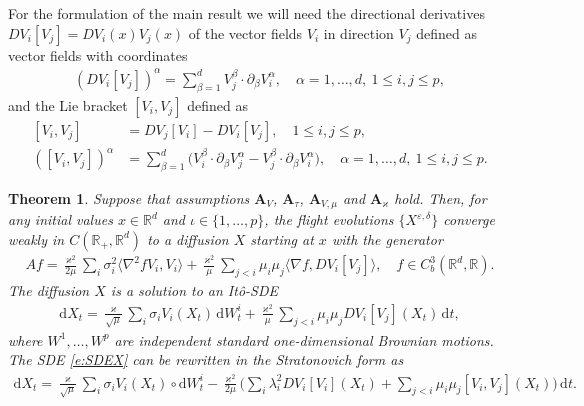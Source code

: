 \documentclass[10pt,a4paper]{amsart}
\newtheorem{thm}{Theorem}
\newcommand{\bR}{\mathbb{R}}
\newcommand{\ba}{\begin{equation}\begin{aligned}}
\newcommand{\di}{\mathrm{d}}
\newcommand{\e}{\varepsilon}
\newcommand{\ea}{\end{aligned}\end{equation}}
\begin{document}
For the formulation of the main result we will need the directional derivatives $D V_i[V_j]=DV_i(x)V_j(x)$ of the vector fields $V_i$
in direction $V_j$ defined as
vector fields with coordinates
\ba
\label{e:DVV}
(D V_i[V_j])^\alpha = \sum_{\beta=1}^d V_j^\beta   \cdot  \partial_\beta V_i^\alpha,\quad \alpha=1,\dots, d,\  1\leq i,j\leq p,
\ea
and the Lie bracket $[V_i,V_j]$ defined as
\ba
{} [V_i,V_j]&= D V_j [ V_i] - D V_i [ V_j],\quad 1\leq i,j\leq p,\\
([V_i,V_j])^\alpha &
= \sum_{\beta=1}^d  \Big(V_i^\beta  \cdot  \partial_\beta V_j^\alpha
- V_j^\beta \cdot \partial_\beta V_i^\alpha\Big) ,\quad \alpha=1,\dots, d,\  1\leq i,j\leq p.
\ea

\begin{thm}
\label{t:A}
Suppose that assumptions
$\mathbf{A}_V$,
$\mathbf{A}_\tau$,
$\mathbf{A}_{V,\mu}$ and
$\mathbf{A}_\varkappa$ hold. Then, for any initial values $x\in\bR^d$ and $\iota\in \{1,\dots,p\}$,
the flight evolutions $\{X^{\e,\delta}\}$ converge weakly in $C(\bR_+,\bR^d)$
to a diffusion $X$ starting at $x$ with the generator
\ba
\label{e:opA}
Af
= \frac{\varkappa^2}{2\mu}  \sum_{i} \sigma_{i}^2 \langle \nabla^2 f  V_i, V_i\rangle
+ \frac{\varkappa^2}{\mu} \sum_{j< i} \mu_i\mu_j \langle \nabla f , D V_i [ V_j] \rangle,\quad f\in C^3_b(\bR^d,\bR).
\ea
The diffusion $X$ is a solution to an It\^o-SDE
\ba
\label{e:SDEX}
\di X_t= \frac{\varkappa}{\sqrt\mu}  \sum_{i} \sigma_{i} V_i(X_t)\,\di W^i_t +
\frac{\varkappa^2}{\mu} \sum_{j< i} \mu_i\mu_j  D V_i [ V_j](X_t)\,\di t,
\ea
where $W^1,\dots,W^p$ are independent standard one-dimensional Brownian motions.
The SDE \eqref{e:SDEX} can be rewritten in the Stratonovich form
as
\ba
\label{e:XStrat}
\di X_t= \frac{\varkappa}{\sqrt\mu}  \sum_{i} \sigma_{i} V_i(X_t)\circ\di W^i_t
-\frac{\varkappa^2}{2\mu} \Big(
\sum_{i} \lambda_i^2  D V_i [ V_i](X_t)
+\sum_{j< i} \mu_i\mu_j  [ V_i,V_j](X_t)
\Big)\,\di t.
\ea
\end{thm}
\end{document}
